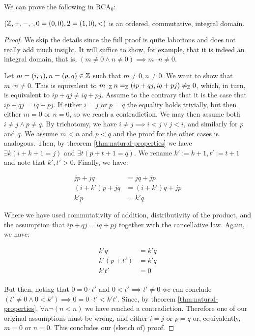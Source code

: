 \documentclass[../main.tex]{memoir}
\begin{document}
We can prove the following in RCA$_0$:

\begin{theorem}
  $(\mathbb{Z}, +, -, \cdot, 0 = (0, 0), 2 = (1, 0), <)$ is an ordered, commutative, integral domain.
\end{theorem}
\begin{proof}
  We skip the details since the full proof is quite laborious and does not really add much insight. It will suffice to show, for example, that it is indeed an integral domain, that is, $(m \neq 0 \land n \neq 0) \implies m \cdot n \neq 0$.

  Let $m = (i, j), n = (p, q) \in \mathbb{Z}$ such that $m \neq 0, n \neq 0$. We want to show that $m \cdot n \neq 0$. This is equivalent to $m \cdot_{\mathbb{Z}} n =_{\mathbb{Z}} (ip + qj, iq + pj) \neq_{\mathbb{Z}} 0$, which, in turn, is equivalent to $ip + qj \neq iq + pj$. Assume to the contrary that it is the case that $ip + qj = iq + pj$. If either $i = j$ or $p = q$ the equality holds trivially, but then either $m = 0$ or $n = 0$, so we reach a contradiction. We may then assume both $i \neq j \land p \neq q$. By trichotomy, we have $i \neq j \implies i < j \lor j < i$, and similarly for $p$ and $q$. We assume $m < n$ and $p < q$ and the proof for the other cases is analogous. Then, by theorem \ref{thm:natural-properties} we have $\exists k (i + k + 1 = j)$ and $\exists t (p + t + 1 = q)$. We rename $k' := k + 1, t' := t + 1$ and note that $k', t' > 0$. Finally, we have:

  \begin{align*}
    jp + jq & = jq + jp \\
    (i + k')p + jq & = (i + k')q + jp \\
    k'p & = k'q
  \end{align*}

  Where we have used commutativity of addition, distributivity of the product, and the assumption that $ip + qj = iq + pj$ together with the cancellative law. Again, we have:

  \begin{align*}
    k'q & = k'q \\
    k'(p + t') & = k'q \\
    k't' & = 0 \\
  \end{align*}

  But then, noting that $0 = 0 \cdot t'$ and $0 < t' \implies t' \neq 0$ we can conclude $(t' \neq 0 \land 0 < k') \implies 0 = 0 \cdot t' < k't'$. Since, by theorem \ref{thm:natural-properties}, $\forall n \neg(n < n)$ we have reached a contradiction. Therefore one of our original assumptions must be wrong, and either $i = j$ or $p = q$ or, equivalently, $m = 0$ or $n = 0$. This concludes our (sketch of) proof.
\end{proof}
\end{document}
